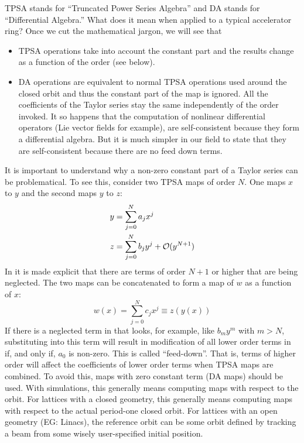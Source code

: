 \documentclass{hitec}     %
\begin{document}
TPSA stands for ``Truncated Power Series Algebra'' and DA stands for ``Differential Algebra.''
What does it mean when applied to a typical accelerator ring? Once we cut the mathematical jargon,
we will see that

\begin{itemize}
\item TPSA operations take into account the constant part and the results change as a function of the order (see below). 
%
\item DA operations are equivalent to normal TPSA operations used around the closed orbit and thus the
constant part of the map is ignored. All the coefficients of the Taylor series stay the same
independently of the order invoked. It so happens that the computation of nonlinear differential
operators (Lie vector fields for example), are self-consistent because they form a differential
algebra. But it is much simpler in our field to state that they are self-consistent because there
are no feed down terms.
\end{itemize}

It is important to understand why a non-zero constant part of a Taylor series can be
problematical. To see this, consider two TPSA maps of order $N$. One maps $x$ to $y$ and the second
maps $y$ to $z$:
\begin{align}
  y &= \sum_{j = 0}^N a_j x^j  \label{yj0n} \\
  z &= \sum_{j = 0}^N b_j y^j + {\cal O}(y^{N+1}) \label{zj0n}
\end{align}
In  it is made explicit that there are terms of order $N+1$ or higher that are being neglected.
The two maps can be concatenated to form a map of {\color{h}$w$ as a function of $x$:
\begin{equation}
  w\left({x}\right) = \sum_{j = 0}^N c_j x^j
\equiv z\left({y\left({x}\right)}\right)
  \label{zj0nc}
\end{equation}
}
If there is a neglected term in  that looks, for example, like $b_m y^m$ with $m > N$, substituting
 into this term will result in modification of all lower order terms in  if, and
only if, $a_0$ is non-zero. This is
called ``feed-down''. That is, terms of higher order will affect the coefficients of lower order
terms when TPSA maps are combined. To avoid this, maps with zero constant term (DA maps) should be used. With
simulations, this generally means computing maps with respect to the   orbit. For
lattices with a closed geometry, this generally means computing maps with respect to the {\color{h} actual period-one closed} 
orbit. For lattices with an open geometry (EG: Linacs), the reference orbit can be some orbit
defined by tracking a beam from some {\color{h} wisely } user-specified initial position.
\end{document}
